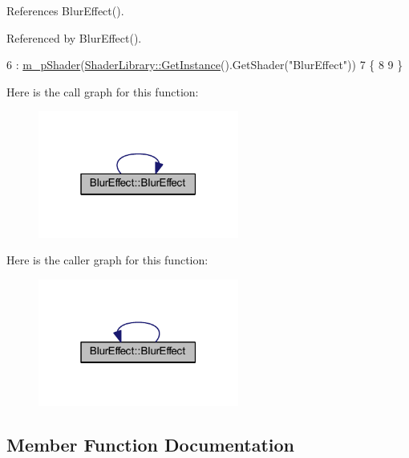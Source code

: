 References Blur\+Effect().



Referenced by Blur\+Effect().


\begin{DoxyCode}
6   : \hyperlink{class_blur_effect_a29dbaae4fbb90818efcabf0d02dbba01}{m\_pShader}(\hyperlink{class_singleton_a74f32751d99bf3cc95fe17aba11f4b07}{ShaderLibrary::GetInstance}().GetShader(\textcolor{stringliteral}{"BlurEffect"}))
7 \{
8   
9 \}
\end{DoxyCode}


Here is the call graph for this function\+:\nopagebreak
\begin{figure}[H]
\begin{center}
\leavevmode
\includegraphics[width=187pt]{class_blur_effect_aad277452b90533f33dbd42bd55b8ed78_cgraph}
\end{center}
\end{figure}




Here is the caller graph for this function\+:\nopagebreak
\begin{figure}[H]
\begin{center}
\leavevmode
\includegraphics[width=187pt]{class_blur_effect_aad277452b90533f33dbd42bd55b8ed78_icgraph}
\end{center}
\end{figure}




\subsection{Member Function Documentation}
